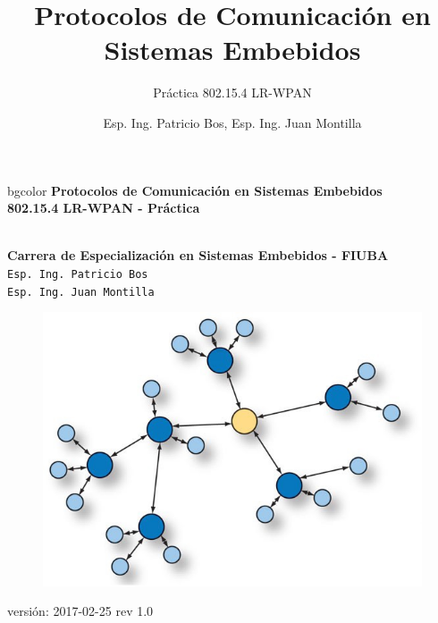 \documentclass[aspectratio=169,handout]{beamer}
\title[802.15.4 LR-WPAN]{Protocolos de Comunicación en Sistemas Embebidos}
\subtitle{Práctica 802.15.4 LR-WPAN}
\author[]{Esp. Ing. Patricio Bos, Esp. Ing. Juan Montilla}
\institute[CESE-FIUBA]{Carrera de Especialización en Sistemas Embebidos - FIUBA}
\date{}
\begin{document}

%



\begingroup
\makeatletter
\setlength{\hoffset}{-.5\beamer@sidebarwidth}
\makeatother
\begin{frame}
\begin{center}
\hfill
    \begin{beamercolorbox}[center,dp=3ex,ht=10.25ex, wd=1\linewidth]{bgcolor}
        \Large\textbf{Protocolos de Comunicación en Sistemas Embebidos}\\
        \huge\textbf{802.15.4 LR-WPAN - Práctica}
    \end{beamercolorbox}
\hfill\hfill
\\
\vspace{5px}
\textbf{Carrera de Especialización en Sistemas Embebidos - FIUBA}\\
\vspace{10px}
\texttt{Esp. Ing. Patricio Bos}\\
\texttt{Esp. Ing. Juan Montilla}\\

\vspace{10px}

\begin{figure}[H]
	\includegraphics[width=.3\textwidth]{./imagenes/red.jpg}
\end{figure}	  	  	
\vspace{5px}
\tiny versión: 2017-02-25 rev 1.0 

\end{center}
\end{frame}
\endgroup
\end{document}
